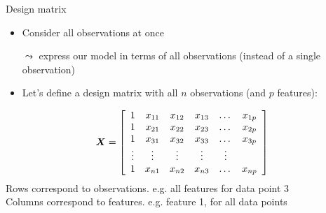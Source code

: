 \documentclass[aspectratio=169]{../latex_main/tntbeamer}  %
\begin{document}
	
	\begin{frame}{Design matrix}
	\begin{itemize}
	    \item Consider all observations at once
	    \item[$\leadsto$] express our model in terms of all observations (instead of a single observation)
	    \item Let's define a design matrix with all $n$ observations (and $p$ features):
	\end{itemize}
	  \begin{align*}
	       \bm{X} = \left[\begin{array}{cccccc}
	          1 & x_{11} & x_{12} & x_{13} & \dots & x_{1p}\\
	          1 & x_{21} & x_{22} & x_{23} & \dots & x_{2p}\\
	          1 & x_{31} & x_{32} & x_{33} & \dots & x_{3p}\\
	          \vdots     & \vdots & \vdots &\vdots &  \vdots \\
	          1 & x_{n1} & x_{n2} & x_{n3} & \dots & x_{np}\\
	    \end{array}\right]
	  \end{align*}
	  Rows correspond to observations. e.g. all features for data point 3\\
	  Columns correspond to features.  e.g. feature 1, for all data points
	\end{frame}
	
\end{document}
